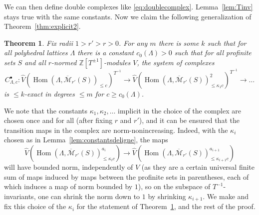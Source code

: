 \documentclass[11pt]{amsbook}
\DeclareMathOperator{\Hom}{Hom}
\numberwithin{equation}{section}
\newtheorem{theorem}{Theorem}
\numberwithin{theorem}{section}
\theoremstyle{definition}
\begin{document}
We can then define double complexes like \eqref{eq:doublecomplex}. Lemma~\ref{lem:Tinv} stays true with the same constants. Now we claim the following generalization of Theorem~\ref{thm:explicit2}.

\begin{theorem}\label{thm:explicit3} Fix radii $1>r'>r>0$. For any $m$ there is some $k$ such that for all polyhedral lattices $\Lambda$ there is a constant $c_0(\Lambda)>0$ such that for all profinite sets $S$ and all $r$-normed $\mathbb Z[T^{\pm 1}]$-modules $V$, the system of complexes
\[
C_{\Lambda,c}^\bullet: \widehat{V}(\Hom(\Lambda,\overline{\mathcal M}_{r'}(S))_{\leq c})^{T^{-1}}\to \widehat{V}(\Hom(\Lambda,\overline{\mathcal M}_{r'}(S))_{\leq \kappa_1c}^2)^{T^{-1}}\to \ldots
\]
is $\leq k$-exact in degrees $\leq m$ for $c\geq c_0(\Lambda)$.
\end{theorem}

We note that the constants $\kappa_1,\kappa_2,\ldots$ implicit in the choice of the complex are chosen once and for all (after fixing $r$ and $r'$), and it can be ensured that the transition maps in the complex are norm-nonincreasing. Indeed, with the $\kappa_i$ chosen as in Lemma~\ref{lem:constantsdeligne}, the maps
\[
\widehat{V}(\Hom(\Lambda,\overline{\mathcal M}_{r'}(S))_{\leq \kappa_ic}^{a_i})\to \widehat{V}(\Hom(\Lambda,\overline{\mathcal M}_{r'}(S))_{\leq \kappa_{i+1}c}^{a_{i+1}})
\]
will have bounded norm, independently of $V$ (as they are a certain universal finite sum of maps induced by maps between the profinite sets in parentheses, each of which induces a map of norm bounded by $1$), so on the subspace of $T^{-1}$-invariants, one can shrink the norm down to $1$ by shrinking $\kappa_{i+1}$. We make and fix this choice of the $\kappa_i$ for the statement of Theorem~\ref{thm:explicit3}, and the rest of the proof.
\end{document}

